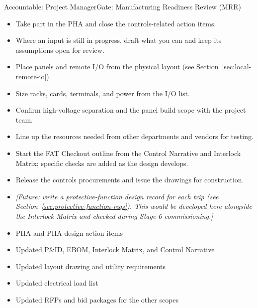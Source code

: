 \begin{stagecard}{Accountable: Project Manager}{Gate: Manufacturing Readiness Review (MRR)}
\begin{minipage}[t]{0.485\linewidth}
\begin{itemize}[leftmargin=*,itemsep=1pt,topsep=2pt]
\end{itemize}
\end{minipage}
\tcbline
{}
\begin{itemize}[leftmargin=*,itemsep=1pt,topsep=2pt]
  \item Take part in the PHA and close the controls-related action items.
  \item Where an input is still in progress, draft what you can and keep its assumptions open for review.
  \item Place panels and remote I/O from the physical layout (see Section~\ref{sec:local-remote-io}).
  \item Size racks, cards, terminals, and power from the I/O list.
  \item Confirm high-voltage separation and the panel build scope with the project team.
  \item Line up the resources needed from other departments and vendors for testing.
  \item Start the FAT Checkout outline from the Control Narrative and Interlock Matrix; specific checks are added as the design develops.
  \item Release the controls procurements and issue the drawings for construction.
  \item \textit{\textcolor{futureblue}{[Future: write a protective-function design record for each trip (see Section~\ref{sec:protective-function-reqs}). This would be developed here alongside the Interlock Matrix and checked during Stage 6 commissioning.]}}
\end{itemize}
\tcbline
{}\par
\begin{minipage}[t]{0.485\linewidth}
\begin{itemize}[leftmargin=*,itemsep=1pt,topsep=2pt]
  \item PHA and PHA design action items
  \item Updated P\&ID, EBOM, Interlock Matrix, and Control Narrative
  \item Updated layout drawing and utility requirements
  \item Updated electrical load list
\end{itemize}
\end{minipage}\hfill
\begin{minipage}[t]{0.485\linewidth}
\begin{itemize}[leftmargin=*,itemsep=1pt,topsep=2pt]
  \item Updated RFPs and bid packages for the other scopes

\end{itemize}
\end{minipage}
\end{stagecard}
